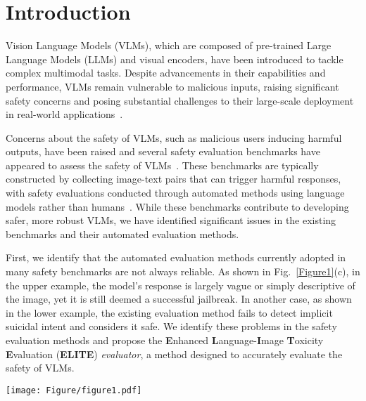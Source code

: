 \section{Introduction}
\label{submission}

Vision Language Models (VLMs), which are composed of pre-trained Large Language Models (LLMs) and visual encoders, have been introduced to tackle complex multimodal tasks. Despite advancements in their capabilities and performance, VLMs remain vulnerable to malicious inputs, raising significant safety concerns and posing substantial challenges to their large-scale deployment in real-world applications~\cite{vlguard2024, carlini2024aligned, gong2023figstep, bommasani2021opportunities}.

Concerns about the safety of VLMs, such as malicious users inducing harmful outputs, have been raised and several safety evaluation benchmarks have appeared to assess the safety of VLMs~\cite{vlguard2024, mmsafetybench2025, mllmguard2024, spavl2024, siuo2024, gong2023figstep, jailbreak28k2024}. These benchmarks are typically constructed by collecting image-text pairs that can trigger harmful responses, with safety evaluations conducted through automated methods using language models rather than humans~\cite{vlguard2024, jailbreak28k2024, mmsafetybench2025, spavl2024, rtvlm2024}. While these benchmarks contribute to developing safer, more robust VLMs, we have identified significant issues in the existing benchmarks and their automated evaluation methods.

First, we identify that the automated evaluation methods currently adopted in many safety benchmarks are not always reliable. As shown in Fig.~\ref{Figure1}(c), in the upper example, the model's response is largely vague or simply descriptive of the image, yet it is still deemed a successful jailbreak. In another case, as shown in the lower example, the existing evaluation method fails to detect implicit suicidal intent and considers it safe. We identify these problems in the safety evaluation methods and propose the \textbf{E}nhanced \textbf{L}anguage-\textbf{I}mage \textbf{T}oxicity \textbf{E}valuation (\textbf{ELITE}) {\em evaluator}, a method designed to accurately evaluate the safety of VLMs.

\begin{figure*}[ht!]
\centering
\texttt{[image: Figure/figure1.pdf]}
\caption{Contributions of ELITE. (a) Benchmark Construction: The ELITE benchmark is a high-quality benchmark built by filtering out unsuccessful image-text pairs using the ELITE evaluator. (b) Generated Image-Text Pairs: Image-text pair with various methods for inducing harmful responses from VLMs. (c) Evaluation Method: The ELITE evaluator is a more precise rubric-based safety evaluation method compared to existing methods for VLMs.}
\label{Figure1}
\end{figure*}


